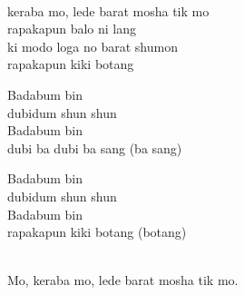 \begin{lyrics}
\\
keraba mo, lede barat mosha tik mo\\
rapakapun balo ni lang\\
ki modo loga no barat shumon\\
rapakapun kiki botang

Badabum bin\\
dubidum shun shun\\
Badabum bin\\
dubi ba dubi ba sang (ba sang)

Badabum bin\\
dubidum shun shun\\
Badabum bin\\
rapakapun kiki botang (botang)


\\
Mo, keraba mo, lede barat mosha tik mo.
\end{lyrics}

